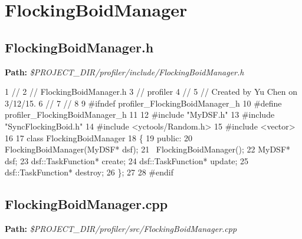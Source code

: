  \hypertarget{_benchmark_program_BenchmarkProgramFlockingBoidManager}{}\section{Flocking\+Boid\+Manager}\label{_benchmark_program_BenchmarkProgramFlockingBoidManager}
\hypertarget{_benchmark_program_BenchmarkProgramFlockingBoidManager_h}{}\subsection{Flocking\+Boid\+Manager.\+h}\label{_benchmark_program_BenchmarkProgramFlockingBoidManager_h}
{\bfseries Path\+:} {\itshape \$\+P\+R\+O\+J\+E\+C\+T\+\_\+\+D\+I\+R/profiler/include/\+Flocking\+Boid\+Manager.h} 
\begin{DoxyCodeInclude}
1 \textcolor{comment}{//}
2 \textcolor{comment}{//  FlockingBoidManager.h}
3 \textcolor{comment}{//  profiler}
4 \textcolor{comment}{//}
5 \textcolor{comment}{//  Created by Yu Chen on 3/12/15.}
6 \textcolor{comment}{//}
7 \textcolor{comment}{//}
8 
9 \textcolor{preprocessor}{#ifndef profiler\_FlockingBoidManager\_h}
10 \textcolor{preprocessor}{#define profiler\_FlockingBoidManager\_h}
11 
12 \textcolor{preprocessor}{#include "MyDSF.h"}
13 \textcolor{preprocessor}{#include "SyncFlockingBoid.h"}
14 \textcolor{preprocessor}{#include <yctools/Random.h>}
15 \textcolor{preprocessor}{#include <vector>}
16 
17 \textcolor{keyword}{class }FlockingBoidManager
18 \{
19 \textcolor{keyword}{public}:
20     FlockingBoidManager(MyDSF* dsf);
21     ~FlockingBoidManager();
22     MyDSF* dsf;
23     dsf::TaskFunction* create;
24     dsf::TaskFunction* update;
25     dsf::TaskFunction* destroy;
26 \};
27 
28 \textcolor{preprocessor}{#endif}
\end{DoxyCodeInclude}
 \hypertarget{_benchmark_program_BenchmarkProgramFlockingBoidManager_cpp}{}\subsection{Flocking\+Boid\+Manager.\+cpp}\label{_benchmark_program_BenchmarkProgramFlockingBoidManager_cpp}
{\bfseries Path\+:} {\itshape \$\+P\+R\+O\+J\+E\+C\+T\+\_\+\+D\+I\+R/profiler/src/\+Flocking\+Boid\+Manager.cpp} 
